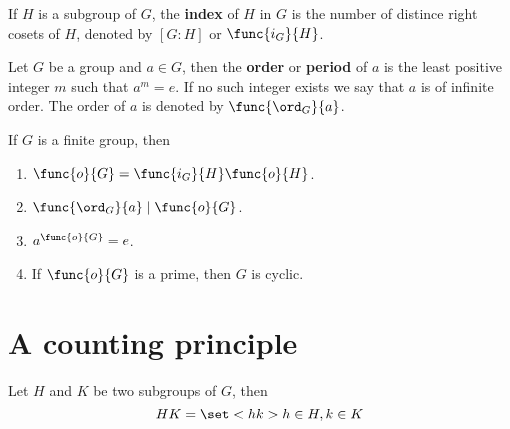 \begin{definition}
    If \(H\) is a subgroup of \(G\), the \textbf{index} of \(H\) in \(G\) is the number of distince right cosets of \(H\), denoted by \([G:H]\) or \(\func{i_G}{H}\).
\end{definition}

\begin{definition}
    Let \(G\) be a group and \(a \in G\), then the \textbf{order} or \textbf{period} of \(a\) is the least positive integer \(m\) such that \(a^m = e\). If no such integer exists we say that \(a\) is of infinite order. The order of \(a\) is denoted by \(\func{\ord_G}{a}\).
\end{definition}

\begin{corollary}
    If \(G\) is a finite group, then 
    \begin{enumerate}
        \item \(\func{o}{G} = \func{i_G}{H} \func{o}{H}\).
        \item \(\func{\ord_G}{a} \mid \func{o}{G}\).
        \item \(a^{\func{o}{G}} = e\).
        \item If \(\func{o}{G}\) is a prime, then \(G\) is cyclic.
    \end{enumerate}
\end{corollary}

\section{A counting principle}
Let \(H\) and \(K\) be two subgroups of \(G\), then 
\begin{equation*}
    HK = \set<hk>{h \in H, k \in K}
\end{equation*}

